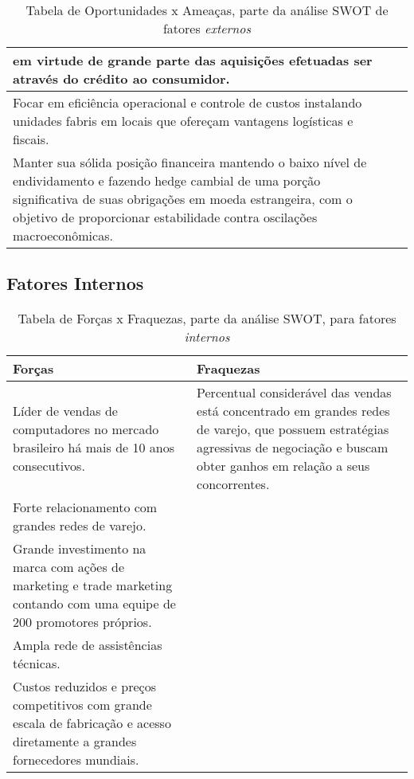 {{{{\begin{center}
\begin{table}[H]
\begin{centering}
\begin{tabular}{>{\centering}p{}|>{\centering}p{}}
em virtude de grande parte das aquisições efetuadas ser através do
crédito ao consumidor. \tabularnewline
\hline 
Focar em eficiência operacional e controle de custos instalando unidades
fabris em locais que ofereçam vantagens logísticas e fiscais.  & \tabularnewline
\hline 
Manter sua sólida posição financeira mantendo o baixo nível de endividamento
e fazendo hedge cambial de uma porção significativa de suas obrigações
em moeda estrangeira, com o objetivo de proporcionar estabilidade
contra oscilações macroeconômicas.  & \tabularnewline
\hline 
\end{tabular}
\par\end{centering}
\caption{Tabela de Oportunidades x Ameaças, parte da análise SWOT de fatores \emph{externos}}
\end{table}
\par\end{center}

\subsection {Fatores Internos}

\begin{center}
\begin{table}[H]
\begin{centering}
\begin{tabular}{>{\centering}p{}|>{\centering}p{}}
\hline
Forças & Fraquezas\tabularnewline
\hline
Líder de vendas de computadores no mercado brasileiro há mais de 10
anos consecutivos.  & Percentual considerável das vendas está concentrado em grandes redes
de varejo, que possuem estratégias agressivas de negociação e buscam
obter ganhos em relação a seus concorrentes.\tabularnewline
\hline
Forte relacionamento com grandes redes de varejo.  & \tabularnewline
\hline
Grande investimento na marca com ações de marketing e trade marketing
contando com uma equipe de 200 promotores próprios.  & \tabularnewline
\hline
Ampla rede de assistências técnicas.  & \tabularnewline
\hline
Custos reduzidos e preços competitivos com grande escala de fabricação
e acesso diretamente a grandes fornecedores mundiais.  & \tabularnewline
\hline
\end{tabular}
\par\end{centering}
\caption{Tabela de Forças x Fraquezas, parte da análise SWOT, para fatores
\emph{internos}}
\end{table}
\par\end{center}

}}}}
